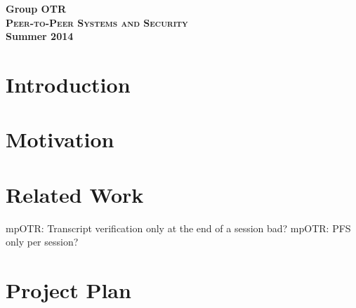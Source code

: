 

\title{}
\author{Markus Teich, Jannik Theiß}
\date{\today}



\begin{titlepage}
    \begin{center}
    \huge \textbf{Group OTR} \\
    \vspace{2cm}
    \LARGE\textbf{\textsc{Peer-to-Peer Systems and Security}}\\
    \vspace{0.5cm}
    \textbf{Summer 2014}
    \vspace{3.5cm}
	\end{center}
\end{titlepage}

\section{Introduction}

\section{Motivation}

\section{Related Work}

mpOTR: Transcript verification only at the end of a session bad?
mpOTR: PFS only per session?

\section{Project Plan}



